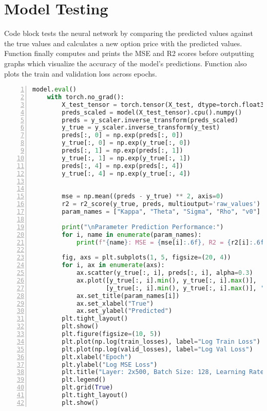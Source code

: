 \documentclass{article}
\begin{document}
\section{Model Testing}
Code block tests the neural network by comparing the predicted values against the true values and calculates a new option price with the predicted values. Function finally computes and prints the MSE and R2 scores before outputting graphs which visualize the accuracy of the model's predictions. Function also plots the train and validation loss across epochs.
\lstset{firstnumber=last}
\begin{lstlisting}[language=Python, caption={Measure Model's Accuracy Using Graphs and Captured Data}, label={lst:imports}, numbers=left]
model.eval()
    with torch.no_grad():
        X_test_tensor = torch.tensor(X_test, dtype=torch.float32).to(device)
        preds_scaled = model(X_test_tensor).cpu().numpy()
        preds = y_scaler.inverse_transform(preds_scaled)
        y_true = y_scaler.inverse_transform(y_test)
        preds[:, 0] = np.exp(preds[:, 0])
        y_true[:, 0] = np.exp(y_true[:, 0])
        preds[:, 1] = np.exp(preds[:, 1])
        y_true[:, 1] = np.exp(y_true[:, 1])
        preds[:, 4] = np.exp(preds[:, 4])
        y_true[:, 4] = np.exp(y_true[:, 4])


        mse = np.mean((preds - y_true) ** 2, axis=0)
        r2 = r2_score(y_true, preds, multioutput='raw_values')
        param_names = ["Kappa", "Theta", "Sigma", "Rho", "v0"]

        print("\nParameter Prediction Performance:")
        for i, name in enumerate(param_names):
            print(f"{name}: MSE = {mse[i]:.6f}, R2 = {r2[i]:.6f}")

        fig, axs = plt.subplots(1, 5, figsize=(20, 4))
        for i, ax in enumerate(axs):
            ax.scatter(y_true[:, i], preds[:, i], alpha=0.3)
            ax.plot([y_true[:, i].min(), y_true[:, i].max()],
                    [y_true[:, i].min(), y_true[:, i].max()], 'r--')
            ax.set_title(param_names[i])
            ax.set_xlabel("True")
            ax.set_ylabel("Predicted")
        plt.tight_layout()
        plt.show()
        plt.figure(figsize=(10, 5))
        plt.plot(np.log(train_losses), label="Log Train Loss")
        plt.plot(np.log(valid_losses), label="Log Val Loss")
        plt.xlabel("Epoch")
        plt.ylabel("Log MSE Loss")
        plt.title("Layer: 2x500, Batch Size: 128, Learning Rate: 0.0001")
        plt.legend()
        plt.grid(True)
        plt.tight_layout()
        plt.show()
\end{lstlisting}
\end{document}
